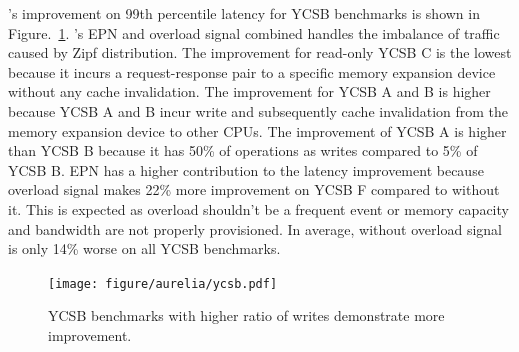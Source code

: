 \aurelia's improvement on 99th percentile latency for YCSB benchmarks is shown in Figure.~\ref{fig:cxl-ycsb-results}.
%
\aurelia's EPN and overload signal combined handles the imbalance of traffic caused by Zipf distribution. 
%
The improvement for read-only YCSB C is the lowest because it incurs a request-response pair to a specific memory expansion device without any cache invalidation.
%
The improvement for YCSB A and B is higher because YCSB A and B incur write and subsequently cache invalidation from the memory expansion device to other CPUs.
%
The improvement of YCSB A is higher than YCSB B because it has 50\% of operations as writes compared to 5\% of YCSB B.  
%
EPN has a higher contribution to the latency improvement because overload signal makes  
22\% more improvement on YCSB F compared to \aurelia without it.
%
This is expected as overload shouldn't be a frequent event or memory capacity and bandwidth are not properly provisioned.
%
In average, \aurelia without overload signal is only 14\% worse on all YCSB benchmarks.

%

\begin{figure}[ht!]    
    \centering
    \texttt{[image: figure/aurelia/ycsb.pdf]}
    \caption{YCSB benchmarks with higher ratio of writes demonstrate more improvement.} 
    \label{fig:cxl-ycsb-results}
\end{figure}


